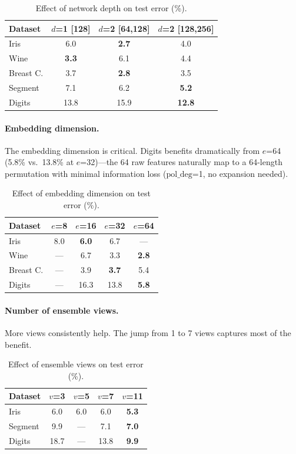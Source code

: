 \documentclass[12pt]{article}
\begin{document}
\begin{table}[ht]
\centering
\caption{Effect of network depth on test error (\%).}
\label{tab:depth}
\begin{tabular}{lccc}
\toprule
Dataset & $d$=1 {[128]} & $d$=2 {[64,128]} & $d$=2 {[128,256]} \\
\midrule
Iris         & 6.0 & \textbf{2.7} & 4.0 \\
Wine         & \textbf{3.3} & 6.1 & 4.4 \\
Breast C.    & 3.7 & \textbf{2.8} & 3.5 \\
Segment      & 7.1 & 6.2 & \textbf{5.2} \\
Digits       & 13.8 & 15.9 & \textbf{12.8} \\
\bottomrule
\end{tabular}
\end{table}

\paragraph{Embedding dimension.}
The embedding dimension is critical. Digits benefits dramatically from $e$=64 (5.8\% vs.\ 13.8\% at $e$=32)---the 64 raw features naturally map to a 64-length permutation with minimal information loss ($\mathrm{pol\_deg}$=1, no expansion needed).

\begin{table}[ht]
\centering
\caption{Effect of embedding dimension on test error (\%).}
\label{tab:embed}
\begin{tabular}{lcccc}
\toprule
Dataset & $e$=8 & $e$=16 & $e$=32 & $e$=64 \\
\midrule
Iris         & 8.0 & \textbf{6.0} & 6.7 & --- \\
Wine         & --- & 6.7 & 3.3 & \textbf{2.8} \\
Breast C.    & --- & 3.9 & \textbf{3.7} & 5.4 \\
Digits       & --- & 16.3 & 13.8 & \textbf{5.8} \\
\bottomrule
\end{tabular}
\end{table}

\paragraph{Number of ensemble views.}
More views consistently help. The jump from 1 to 7 views captures most of the benefit.

\begin{table}[ht]
\centering
\caption{Effect of ensemble views on test error (\%).}
\label{tab:views}
\begin{tabular}{lcccc}
\toprule
Dataset & $v$=3 & $v$=5 & $v$=7 & $v$=11 \\
\midrule
Iris         & 6.0 & 6.0 & 6.0 & \textbf{5.3} \\
Segment      & 9.9 & --- & 7.1 & \textbf{7.0} \\
Digits       & 18.7 & --- & 13.8 & \textbf{9.9} \\
\bottomrule
\end{tabular}
\end{table}
\end{document}
